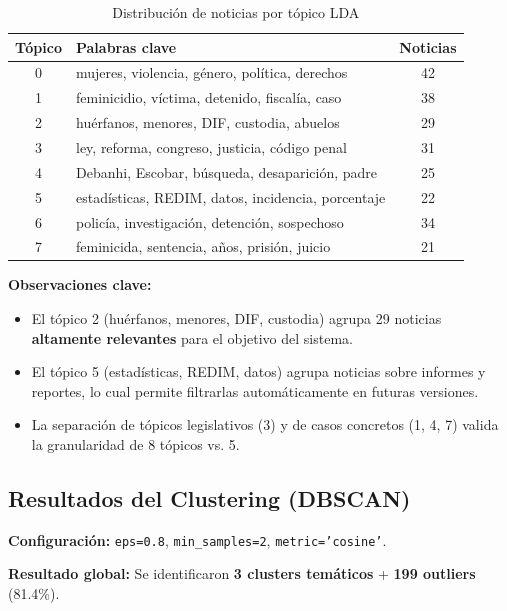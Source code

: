 \begin{table}[h]
\centering
\caption{Distribución de noticias por tópico LDA}
\label{tab:topicos_lda}
\begin{tabular}{|c|l|c|}
\hline
\textbf{Tópico} & \textbf{Palabras clave} & \textbf{Noticias} \\ \hline
0 & mujeres, violencia, género, política, derechos & 42 \\ \hline
1 & feminicidio, víctima, detenido, fiscalía, caso & 38 \\ \hline
2 & huérfanos, menores, DIF, custodia, abuelos & 29 \\ \hline
3 & ley, reforma, congreso, justicia, código penal & 31 \\ \hline
4 & Debanhi, Escobar, búsqueda, desaparición, padre & 25 \\ \hline
5 & estadísticas, REDIM, datos, incidencia, porcentaje & 22 \\ \hline
6 & policía, investigación, detención, sospechoso & 34 \\ \hline
7 & feminicida, sentencia, años, prisión, juicio & 21 \\ \hline
\end{tabular}
\end{table}

\textbf{Observaciones clave:}
\begin{itemize}
    \item El tópico 2 (huérfanos, menores, DIF, custodia) agrupa 29 noticias \textbf{altamente relevantes} para el objetivo del sistema.
    \item El tópico 5 (estadísticas, REDIM, datos) agrupa noticias sobre informes y reportes, lo cual permite filtrarlas automáticamente en futuras versiones.
    \item La separación de tópicos legislativos (3) y de casos concretos (1, 4, 7) valida la granularidad de 8 tópicos vs. 5.
\end{itemize}

\subsection{Resultados del Clustering (DBSCAN)}
\label{subsec:resultados_clustering}

\textbf{Configuración:} \texttt{eps=0.8}, \texttt{min\_samples=2}, \texttt{metric='cosine'}.

\textbf{Resultado global:} Se identificaron \textbf{3 clusters temáticos} + \textbf{199 outliers} (81.4\%).

